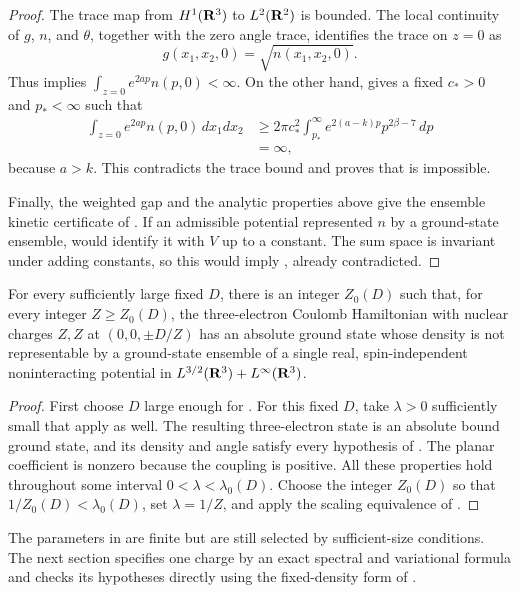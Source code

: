 \begin{proof}
The trace map from \(H^1(\mathbf R^3)\) to \(L^2(\mathbf R^2)\) is bounded.
The local continuity of \(g\), \(n\), and \(\theta\), together with the
zero angle trace, identifies the trace on \(z=0\) as
\[
 g(x_1,x_2,0)=\sqrt{n(x_1,x_2,0)}.
\]
Thus  implies
\(\int_{z=0}e^{2ap}n(p,0)<\infty\).  On the other hand,
 gives a fixed \(c_*>0\) and \(p_*<\infty\) such that
\begin{align*}
 \int_{z=0}e^{2ap}n(p,0)\,dx_1dx_2
 &\ge2\pi c_*^2\int_{p_*}^\infty
            e^{2(a-k)p}p^{2\beta-7}\,dp\\
 &=\infty,
\end{align*}
because \(a>k\).  This contradicts the trace bound and proves that
 is impossible.

Finally, the weighted gap and the analytic properties above give the
ensemble kinetic certificate of .
If an admissible potential represented \(n\) by a ground-state ensemble,
 would identify it with \(V\) up to
a constant.  The sum space is invariant under adding constants, so this
would imply , already contradicted.
\end{proof}

\begin{theorem}
\label{thm:qualitative-counterexample}
For every sufficiently large fixed \(D\), there is an integer
\(Z_0(D)\) such that, for every integer \(Z\ge Z_0(D)\), the
three-electron Coulomb Hamiltonian with nuclear charges \(Z,Z\) at
\((0,0,\pm D/Z)\) has an absolute ground state whose density is not
representable by a ground-state ensemble of a single real,
spin-independent noninteracting potential in
\(L^{3/2}(\mathbf R^3)+L^\infty(\mathbf R^3)\).
\end{theorem}

\begin{proof}
First choose \(D\) large enough for
.
For this fixed \(D\), take \(\lambda>0\) sufficiently small that
apply as well.  The resulting three-electron state is an absolute bound
ground state, and its density and angle satisfy every hypothesis of
.  The planar coefficient is nonzero because the
coupling is positive.  All these properties hold throughout some
interval \(0<\lambda<\lambda_0(D)\).  Choose the integer \(Z_0(D)\)
so that \(1/Z_0(D)<\lambda_0(D)\), set \(\lambda=1/Z\), and apply the
scaling equivalence of .
\end{proof}

The parameters in  are finite but
are still selected by sufficient-size conditions.  The next section
specifies one charge by an exact spectral and variational formula and
checks its hypotheses directly using the fixed-density form of
.

